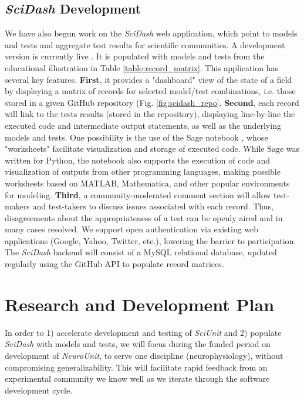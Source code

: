 \documentclass[11pt,letterpaper]{article}
\begin{document}
\subsection{\textit{SciDash} Development}
We have also begun work on the \textit{SciDash} web application, which point to models and tests and aggregate test results for scientific communities. A development version is currently live \cite{scidash_url}.  It is populated with models and tests from the educational illustration in Table \ref{table:record_matrix}.  This application has several key features.  \textbf{First}, it provides a "dashboard" view of the state of a field by displaying a matrix of records for selected model/test combinations, i.e. those stored in a given GitHub repository (Fig. \ref{fig:scidash_repo}.  \textbf{Second}, each record will link to the tests results (stored in the repository), displaying line-by-line the executed code and intermediate output statements, as well as the underlying models and tests.  One possibility is the use of the Sage notebook \cite{sagenb_url}, whose "worksheets" facilitate visualization and storage of executed code.  While Sage was written for Python, the notebook also supports the execution of code and visualization of outputs from other programming languages, making possible worksheets based on MATLAB, Mathematica, and other popular environments for modeling.  \textbf{Third}, a community-moderated comment section will allow test-makers and test-takers to discuss issues associated with each record.  Thus, disagreements about the appropriateness of a test can be openly aired and in many cases resolved.  We support open authentication via existing web applications (Google, Yahoo, Twitter, etc.), lowering the barrier to participation.  The \textit{SciDash} backend will consist of a MySQL relational database, updated regularly using the GitHub API to populate record matrices.  

\section{Research and Development Plan}
In order to 1) accelerate development and testing of \textit{SciUnit} and 2) populate \textit{SciDash} with models and tests, we will focus during the funded period on development of \textit{NeuroUnit}, to serve one discipline (neurophysiology), without compromising generalizability. This will facilitate rapid feedback from an experimental community we know well as we iterate through the software development cycle.  
\end{document}
